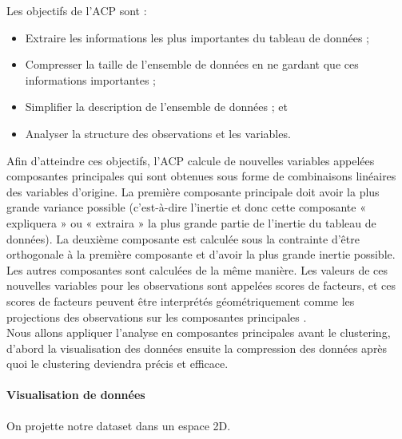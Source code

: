 Les objectifs de l’ACP sont :
\begin{itemize}
	\item Extraire les informations les plus importantes du tableau de données ;
	\item Compresser la taille de l'ensemble de données en ne gardant que ces informations importantes ;
	\item Simplifier la description de l'ensemble de données ; et
	\item Analyser la structure des observations et les variables.
\end{itemize}
Afin d'atteindre ces objectifs, l'ACP calcule de nouvelles variables appelées composantes principales qui sont obtenues sous forme de combinaisons linéaires des variables d'origine. La première composante principale doit avoir la plus grande variance possible (c'est-à-dire l'inertie et donc cette composante « expliquera » ou « extraira » la plus grande partie de l'inertie du tableau de données). La deuxième composante est calculée sous la contrainte d'être orthogonale à la première composante et d'avoir la plus grande inertie possible. Les autres composantes sont calculées de la même manière. Les valeurs de ces nouvelles variables pour les observations sont appelées scores de facteurs, et ces scores de facteurs peuvent être interprétés géométriquement comme les projections des observations sur les composantes principales \cite{abdi2010principal}. \\
Nous allons appliquer l'analyse en composantes principales avant le clustering, d’abord la visualisation des données ensuite la compression des données après quoi le clustering deviendra précis et efficace.

\newpage

\paragraph{Visualisation de données}
On projette notre dataset dans un espace 2D.

